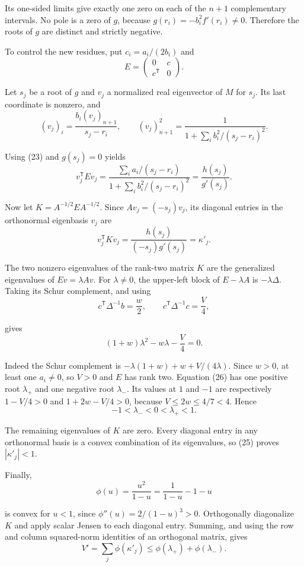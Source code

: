 \documentclass[
  11pt,
  a4paper,
]{article}
\begin{document}
Its one-sided limits give exactly one zero on each of the \(n+1\)
complementary intervals. No pole is a zero of \(g\), because
\(g(r_i)=-b_i^2f'(r_i)\ne0\). Therefore the roots of \(g\) are distinct
and strictly negative.

To control the new residues, put \(c_i=a_i/(2b_i)\) and
\nopagebreak
\[
E=\begin{pmatrix}0&c\\c^{\mathsf T}&0\end{pmatrix}.
\]

Let \(s_j\) be a root of \(g\) and \(v_j\) a normalized real eigenvector
of \(M\) for \(s_j\). Its last coordinate is nonzero, and
\nopagebreak
\[
(v_j)_i=\frac{b_i(v_j)_{n+1}}{s_j-r_i},\qquad
(v_j)_{n+1}^2=
\frac{1}{1+\sum_i b_i^2/(s_j-r_i)^2}.
\]

Using (23) and \(g(s_j)=0\) yields
\nopagebreak
\[
v_j^{\mathsf T}Ev_j
=\frac{\sum_i a_i/(s_j-r_i)}
 {1+\sum_i b_i^2/(s_j-r_i)^2}
=\frac{h(s_j)}{g'(s_j)}.\tag{24}
\]

Now let \(K=A^{-1/2}EA^{-1/2}\). Since \(Av_j=(-s_j)v_j\), its diagonal
entries in the orthonormal eigenbasis \(v_j\) are
\nopagebreak
\[
v_j^{\mathsf T}Kv_j
=\frac{h(s_j)}{(-s_j)g'(s_j)}=\kappa'_j.\tag{25}
\]

The two nonzero eigenvalues of the rank-two matrix \(K\) are the
generalized eigenvalues of \(Ev=\lambda Av\). For \(\lambda\ne0\), the
upper-left block of \(E-\lambda A\) is \(-\lambda\Delta\). Taking its
Schur complement, and using
\nopagebreak
\[
c^{\mathsf T}\Delta^{-1}b=\frac w2,\qquad
c^{\mathsf T}\Delta^{-1}c=\frac V4,
\]

gives
\nopagebreak
\[
(1+w)\lambda^2-w\lambda-\frac V4=0.\tag{26}
\]

Indeed the Schur complement is \(-\lambda(1+w)+w+V/(4\lambda)\). Since
\(w>0\), at least one \(a_i\ne0\), so \(V>0\) and \(E\) has rank two.
Equation (26) has one positive root \(\lambda_+\) and one negative root
\(\lambda_-\). Its values at \(1\) and \(-1\) are respectively
\(1-V/4>0\) and \(1+2w-V/4>0\), because \(V\leq2w\leq4/7<4\). Hence
\nopagebreak
\[
-1<\lambda_-<0<\lambda_+<1.
\]

The remaining eigenvalues of \(K\) are zero. Every diagonal entry in any
orthonormal basis is a convex combination of its eigenvalues, so (25)
proves \(|\kappa'_j|<1\).

Finally,
\nopagebreak
\[
\phi(u)=\frac{u^2}{1-u}=\frac1{1-u}-1-u
\]

is convex for \(u<1\), since \(\phi''(u)=2/(1-u)^3>0\). Orthogonally
diagonalize \(K\) and apply scalar Jensen to each diagonal entry.
Summing, and using the row and column squared-norm identities of an
orthogonal matrix, gives
\nopagebreak
\[
V'=\sum_j\phi(\kappa'_j)
\leq\phi(\lambda_+)+\phi(\lambda_-).\tag{27}
\]
\end{document}
